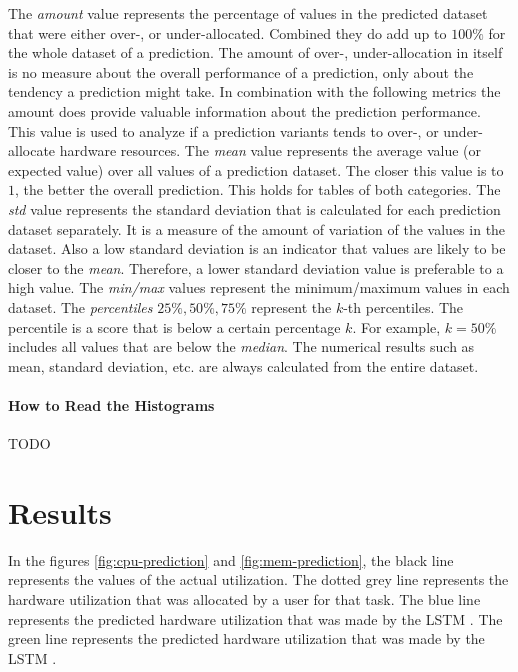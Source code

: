 \documentclass{article}
\begin{document}
    The \emph{amount} value represents the percentage of values in the predicted dataset that were either over-, or under-allocated. Combined they do add up to $100\%$ for the whole dataset of a prediction.
    The amount of over-, under-allocation in itself is no measure about the overall performance of a prediction, only about the tendency a prediction might take. In combination with the following metrics the amount does provide valuable information about the prediction performance.
    This value is used to analyze if a prediction variants tends to over-, or under-allocate hardware resources.
    The \emph{mean} value represents the average value (or expected value) over all values of a prediction dataset. The closer this value is to $1$, the better the overall prediction. This holds for tables of both categories.
    The \emph{std} value represents the standard deviation that is calculated for each prediction dataset separately.
    It is a measure of the amount of variation of the values in the dataset. Also a low standard deviation is an indicator that values are likely to be closer to the \emph{mean}. Therefore, a lower standard deviation value is preferable to a high value.
    The \emph{min/max} values represent the minimum/maximum values in each dataset.
    The \emph{percentiles} $25\%, 50\%, 75\%$ represent the $k$-th percentiles. The percentile is a score that is below a certain percentage $k$. For example, $k = 50\%$ includes all values that are below the \emph{median}.
    The numerical results such as mean, standard deviation, etc. are always calculated from the entire dataset.

  \paragraph{How to Read the Histograms}
  \label{par:how-to-read-histograms}

    TODO
  
\pagebreak
  \section{Results}

    In the figures \ref{fig:cpu-prediction} and \ref{fig:mem-prediction}, the black line represents the values of the actual utilization.
    The dotted grey line represents the hardware utilization that was allocated by a user for that task.
    The blue line represents the predicted hardware utilization that was made by the LSTM .
    The green line represents the predicted hardware utilization that was made by the LSTM .
\end{document}
